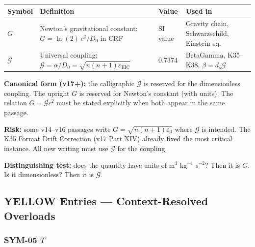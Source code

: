 \documentclass[12pt, a4paper]{article}
\begin{document}
\begin{redbox}[title={SYM-04 \textmd{---} $G$ vs $\mathcal{G}$ \textmd{(Newton's constant vs universal coupling)}}]

\medskip
\renewcommand{\arraystretch}{1.35}
\begin{tabular}{p{2.0cm} p{5.0cm} p{1.8cm} p{3.5cm}}
\toprule
\textbf{Symbol} & \textbf{Definition} &
\textbf{Value} & \textbf{Used in}\\
\midrule
$G$ &
  Newton's gravitational constant;
  $G = \ln(2)\,c^2/D_0$ in CRF &
  SI value &
  Gravity chain, Schwarzschild, Einstein eq.\\
$\mathcal{G}$ &
  Universal coupling;
  $\mathcal{G} = \alpha/D_0 = \sqrt{n(n+1)\varepsilon_{\text{EIC}}}$ &
  $0.7374$ &
  BetaGamma, K35--K38, $\beta = d_s\mathcal{G}$\\
\bottomrule
\end{tabular}

\medskip
\textbf{Canonical form (v17+):} the calligraphic $\mathcal{G}$ is
reserved for the dimensionless coupling. The upright $G$ is reserved
for Newton's constant (with units). The relation $G = \mathcal{G}c^2$
must be stated explicitly when both appear in the same passage.

\textbf{Risk:} some v14--v16 passages write $G = \sqrt{n(n+1)\varepsilon_0}$
where $\mathcal{G}$ is intended. The K35 Format Drift Correction
(v17 Part XIV) already fixed the most critical instance. All new
writing must use $\mathcal{G}$ for the coupling.

\textbf{Distinguishing test:} does the quantity have units of
m$^3$ kg$^{-1}$ s$^{-2}$? Then it is $G$. Is it dimensionless?
Then it is $\mathcal{G}$.
\end{redbox}

\subsection{YELLOW Entries — Context-Resolved Overloads}

\subsubsection*{SYM-05 \quad $T$}
\end{document}
